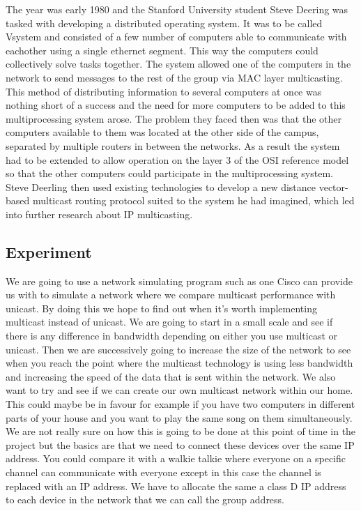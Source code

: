 \documentclass[9pt,a4paper]{acmproc}
\begin{document}
The year was early 1980 and the Stanford University student Steve Deering was tasked with developing a distributed operating system. It was to be called Vsystem and consisted of a few number of computers able to communicate with eachother using a single ethernet segment. This way the computers could collectively solve tasks together. The system allowed one of the computers in the network to send messages to the rest of the group via MAC layer multicasting. This method of distributing information to several computers at once was nothing short of a success and the need for more computers to be added to this multiprocessing system arose. The problem they faced then was that the other computers available to them was located at the other side of the campus, separated by multiple routers in between the networks. As a result the system had to be extended to allow operation on the layer 3 of the OSI reference model so that the other computers could participate in the multiprocessing system. Steve Deerling then used existing technologies to develop a new distance vector-based multicast routing protocol suited to the system he had imagined, which led into further research about IP multicasting. \cite[s.~7]{briefHist}


\subsection{Experiment}

We are going to use a network simulating program such as one Cisco can provide us with to simulate a network where we compare multicast performance with unicast. By doing this we hope to find out when it's worth implementing multicast instead of unicast. We are going to start in a small scale and see if there is any difference in bandwidth depending on either you use multicast or unicast. Then we are successively going to increase the size of the network to see when you reach the point where the multicast technology is using less bandwidth and increasing the speed of the data that is sent within the network.
We also want to try and see if we can create our own multicast network within our home. This could maybe be in favour for example if you have two computers in different parts of your house and you want to play the same song on them simultaneously. We are not really sure on how this is going to be done at this point of time in the project but the basics are that we need to connect these devices over the same IP address. You could compare it with a walkie talkie where everyone on a specific channel can communicate with everyone except in this case the channel is replaced with an IP address. We have to allocate the same a class D IP address to each device in the network that we can call the group address.
\end{document}
